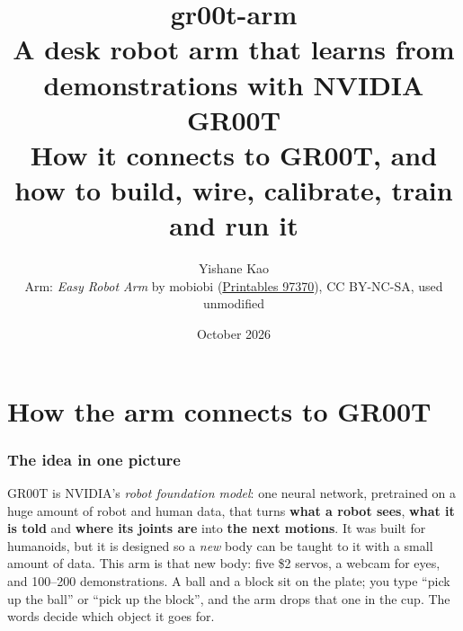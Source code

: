 \documentclass[11pt]{article}
\title{\textbf{gr00t-arm}\\[2pt]\large A desk robot arm that learns from demonstrations with NVIDIA GR00T\\[2pt]
\normalsize How it connects to GR00T, and how to build, wire, calibrate, train and run it}
\author{Yishane Kao\\[2pt]\small Arm: \emph{Easy Robot Arm} by mobiobi
  (\href{https://www.printables.com/model/97370}{Printables 97370}), CC BY-NC-SA, used unmodified}
\date{October 2026}
\begin{document}
\maketitle
\tableofcontents
\clearpage

\part{How the arm connects to GR00T}

\section{The idea in one picture}

GR00T is NVIDIA's \emph{robot foundation model}: one neural network, pretrained on a huge
amount of robot and human data, that turns \textbf{what a robot sees}, \textbf{what it is
told} and \textbf{where its joints are} into \textbf{the next motions}. It was built for
humanoids, but it is designed so a \emph{new} body can be taught to it with a small amount of
data. This arm is that new body: five \$2 servos, a webcam for eyes, and 100--200
demonstrations. A ball and a block sit on the plate; you type ``pick up the ball'' or ``pick up
the block'', and the arm drops that one in the cup. The words decide which object it goes for.
\end{document}
